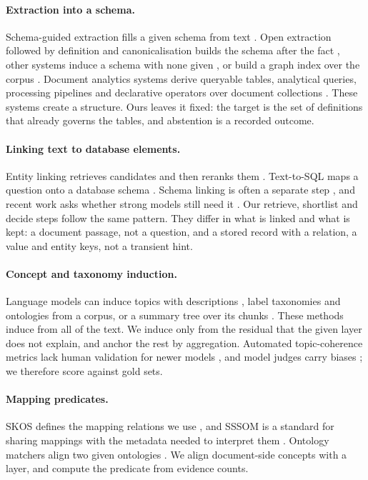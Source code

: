 \documentclass[11pt,a4paper]{article}
\begin{document}
\paragraph{Extraction into a schema.} Schema-guided extraction fills a given schema from text \cite{caufield2024spires}. Open extraction followed by definition and canonicalisation builds the schema after the fact \cite{zhang2024edc}, other systems induce a schema with none given \cite{bai2025autoschemakg}, or build a graph index over the corpus \cite{edge2024graphrag}. Document analytics systems derive queryable tables, analytical queries, processing pipelines and declarative operators over document collections \cite{arora2023evaporate,lin2024zendb,shankar2024docetl,patel2024lotus}. These systems create a structure. Ours leaves it fixed: the target is the set of definitions that already governs the tables, and abstention is a recorded outcome.

\paragraph{Linking text to database elements.} Entity linking retrieves candidates and then reranks them \cite{wu2020blink}. Text-to-SQL maps a question onto a database schema \cite{yu2018spider,li2023bird}. Schema linking is often a separate step \cite{li2023resdsql}, and recent work asks whether strong models still need it \cite{maamari2024death}. Our retrieve, shortlist and decide steps follow the same pattern. They differ in what is linked and what is kept: a document passage, not a question, and a stored record with a relation, a value and entity keys, not a transient hint.

\paragraph{Concept and taxonomy induction.} Language models can induce topics with descriptions \cite{pham2024topicgpt}, label taxonomies \cite{wan2024tntllm,kargupta2025taxoadapt} and ontologies \cite{babaei2023llms4ol,lo2024ollm} from a corpus, or a summary tree over its chunks \cite{sarthi2024raptor}. These methods induce from all of the text. We induce only from the residual that the given layer does not explain, and anchor the rest by aggregation. Automated topic-coherence metrics lack human validation for newer models \cite{hoyle2021automated}, and model judges carry biases \cite{thakur2024judging}; we therefore score against gold sets.

\paragraph{Mapping predicates.} SKOS defines the mapping relations we use \cite{miles2009skos}, and SSSOM is a standard for sharing mappings with the metadata needed to interpret them \cite{matentzoglu2022sssom}. Ontology matchers align two given ontologies \cite{jimenez2011logmap,qiang2024agentom}. We align document-side concepts with a layer, and compute the predicate from evidence counts.
\end{document}
